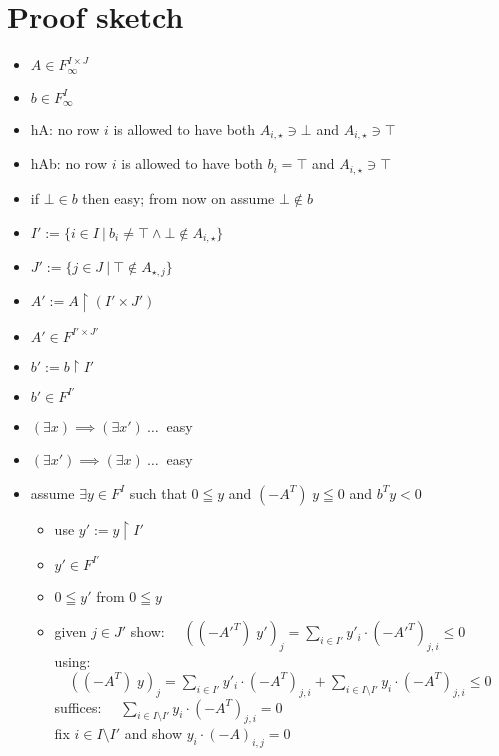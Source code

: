 \documentclass[]{article}
\begin{document}
\section{Proof sketch}

\renewcommand{\labelitemi}{$\bullet$}
\renewcommand{\labelitemii}{$\bullet$}
\renewcommand{\labelitemiii}{$\bullet$}
\renewcommand{\labelitemiv}{$\bullet$}

\begin{itemize}
\item $ A \in F_\infty^{I \times J} $
\item $ b \in F_\infty^{I} $
\item hA: no row $i$ is allowed to have both $A_{i, \star} \ni \bot$ and $A_{i, \star} \ni \top$
\item hAb: no row $i$ is allowed to have both $b_i = \top$ and $A_{i, \star} \ni \top$
\item if $\bot \in b$ then easy; from now on assume $\bot \notin b$
\item $ I' := \{ i \in I ~|~ b_i \neq \top \wedge \bot \notin A_{i, \star} \} $
\item $ J' := \{ j \in J ~|~ \top \notin A_{\star, j}  \} $
\item $ A' := A \restriction (I' \times J') $
\item $ A' \in F^{I' \times J'} $
\item $ b' := b \restriction I' $
\item $ b' \in F^{I'} $
\item $ (\exists x) \implies (\exists x') \ \dots \ $ easy
\item $ (\exists x') \implies (\exists x) \ \dots \ $ easy
\item assume $\exists y \in F^I$ such that $0 \leqq y$ and $(-A^T)\; y \leqq 0$ and $b^T y < 0$
\begin{itemize}
	\item use $y' := y \restriction I'$
	\item $ y' \in F^{I'} $
	\item $0 \leqq y'$ from $0 \leqq y$
	\item given $j \in J'$ show: $\quad ((-A'^T)\; y')_{j} = \sum\limits_{i \in I'} y'_i \cdot (-A'^T)_{j,i} \le 0 $\\
	using: $\quad ((-A^T)\; y)_j =
	\sum\limits_{i \in I'} y'_i \cdot (-A^T)_{j,i} + \sum\limits_{i \in I \setminus I'} y_i \cdot (-A^T)_{j,i} \le 0 $
	suffices: $\quad \sum\limits_{i \in I \setminus I'} y_i \cdot (-A^T)_{j,i} = 0 $ \\
	fix $i \in I \setminus I'$ and show $ y_i \cdot (-A)_{i,j} = 0 $

\end{itemize}
\end{itemize}
\end{document}
